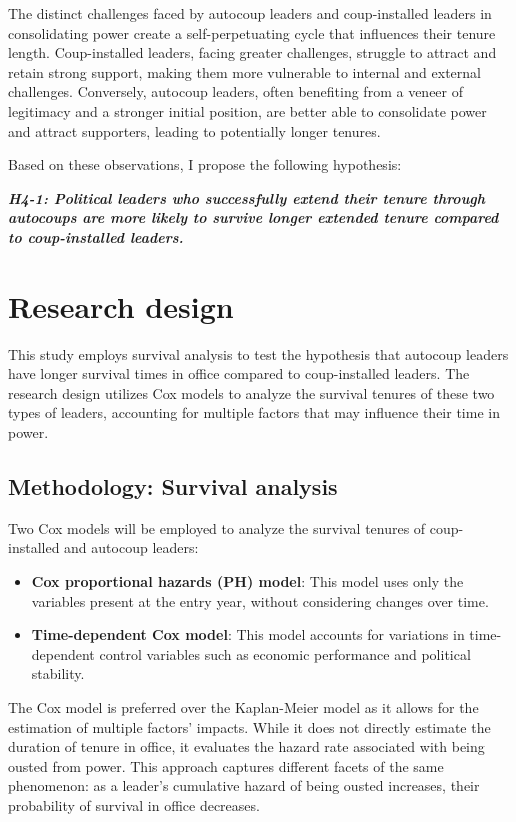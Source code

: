 \documentclass[
  12pt,
]{report}
\begin{document}
The distinct challenges faced by autocoup leaders and coup-installed
leaders in consolidating power create a self-perpetuating cycle that
influences their tenure length. Coup-installed leaders, facing greater
challenges, struggle to attract and retain strong support, making them
more vulnerable to internal and external challenges. Conversely,
autocoup leaders, often benefiting from a veneer of legitimacy and a
stronger initial position, are better able to consolidate power and
attract supporters, leading to potentially longer tenures.

Based on these observations, I propose the following hypothesis:

\textbf{\emph{H4-1: Political leaders who successfully extend their
tenure through autocoups are more likely to survive longer extended
tenure compared to coup-installed leaders.}}

\section{Research design}\label{research-design-1}

This study employs survival analysis to test the hypothesis that
autocoup leaders have longer survival times in office compared to
coup-installed leaders. The research design utilizes Cox models to
analyze the survival tenures of these two types of leaders, accounting
for multiple factors that may influence their time in power.

\subsection{Methodology: Survival
analysis}\label{methodology-survival-analysis}

Two Cox models will be employed to analyze the survival tenures of
coup-installed and autocoup leaders:

\begin{itemize}
\item
  \textbf{Cox proportional hazards (PH) model}: This model uses only the
  variables present at the entry year, without considering changes over
  time.
\item
  \textbf{Time-dependent Cox model}: This model accounts for variations
  in time-dependent control variables such as economic performance and
  political stability.
\end{itemize}

The Cox model is preferred over the Kaplan-Meier model as it allows for
the estimation of multiple factors' impacts. While it does not directly
estimate the duration of tenure in office, it evaluates the hazard rate
associated with being ousted from power. This approach captures
different facets of the same phenomenon: as a leader's cumulative hazard
of being ousted increases, their probability of survival in office
decreases.
\end{document}
